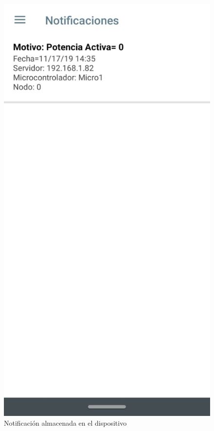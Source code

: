 \begin{figure}[H]
	\centering
	\includegraphics[scale=.4]{Capitulo4/software/submodulos/images/muestra03.jpg}
	\caption{Notificación almacenada en el dispositivo}	
	\label{fig:muestra 14}
\end{figure} 


